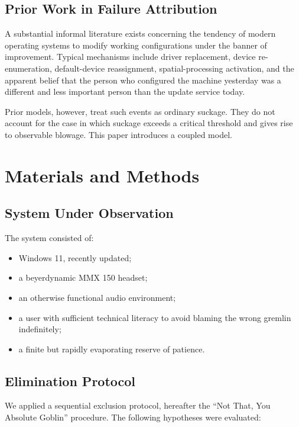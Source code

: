 \documentclass[10pt,twocolumn]{article}
\begin{document}
\subsection{Prior Work in Failure Attribution}

A substantial informal literature exists concerning the tendency of modern operating systems to modify working configurations under the banner of improvement. Typical mechanisms include driver replacement, device re-enumeration, default-device reassignment, spatial-processing activation, and the apparent belief that the person who configured the machine yesterday was a different and less important person than the update service today.

Prior models, however, treat such events as ordinary suckage. They do not account for the case in which suckage exceeds a critical threshold and gives rise to observable blowage. This paper introduces a coupled model.

\section{Materials and Methods}

\subsection{System Under Observation}

The system consisted of:
\begin{itemize}
\item Windows 11, recently updated;
\item a beyerdynamic MMX 150 headset;
\item an otherwise functional audio environment;
\item a user with sufficient technical literacy to avoid blaming the wrong gremlin indefinitely;
\item a finite but rapidly evaporating reserve of patience.
\end{itemize}

\subsection{Elimination Protocol}

We applied a sequential exclusion protocol, hereafter the ``Not That, You Absolute Goblin'' procedure. The following hypotheses were evaluated:
\end{document}

